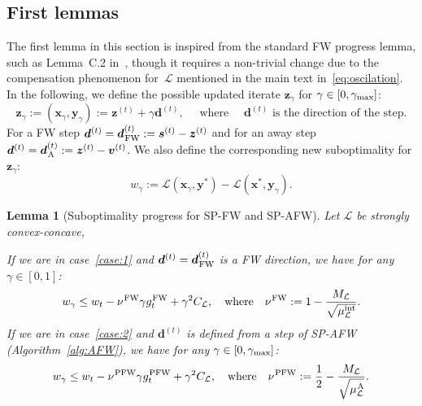 \documentclass[twoside]{article}
\renewcommand{\L}{\mathcal{L}}
\newcommand{\x}{\bm{x}}
\newcommand{\y}{\bm{y}}
\newcommand{\z}{\bm{z}}
\newcommand{\zt}{\bm{z}^{(t)}}
\newcommand{\st}{\bm{s}^{(t)}}
\newcommand{\vt}{\bm{v}^{(t)}}
\newcommand{\dt}{\bm{d}^{(t)}}
\newcommand{\wt}{w_t}
\newcommand{\gap}{g_{t}}
\newcommand{\CondNumb}{\nu}
\newtheorem{lemma}[definition]{Lemma}
\newcommand{\stepsize}{\gamma}
\newcommand{\stepmax}{\stepsize_{\textnormal{\scriptsize max}}} %
\newcommand{\FW}{{\hspace{0.05em}\textnormal{FW}}}
\newcommand{\PW}{{\hspace{0.05em}\textnormal{PFW}}}
\newcommand{\away}{{\hspace{0.05em}\textnormal{A}}}
\newcommand{\muIntL}{\mu^{\text{int}}_\L} %
\newcommand{\0}{\mathbf{0}} %
\begin{document}
\subsection{First lemmas}
  The first lemma in this section is inspired from the standard FW progress lemma, such as Lemma~C.2 in~\citep{lacoste2013block}, though it requires a non-trivial change due to the compensation phenomenon for~$\L$ mentioned in the main text in~\eqref{eq:oscilation}.
  In the following, we define the possible updated iterate $\z_\stepsize$ for $\stepsize \in [0, \stepmax]$:
  \begin{equation}
  \z_\gamma := (\x_\gamma, \y_\gamma):= \zt + \gamma \dt, \quad \text{ where } \quad \dt \text{ is the direction of the step.}
  \end{equation}
  For a FW step $\dt = \dt_{\FW}:= \st - \zt$ and for an away step $\dt = \dt_{\away} := \zt - \vt$. We also define the corresponding new suboptimality for $\z_\gamma$:
  \begin{equation}
    w_\gamma := \L(\x_\gamma, \y^*) - \L(\x^*,\y_\gamma).
  \end{equation}
  \begin{lemma}[Suboptimality progress for SP-FW and SP-AFW] \label{lemme:ineg}
  Let $\L$ be strongly convex-concave, 

    If we are in case~\eqref{case:1} and $\dt = \dt_{\FW}$ is a FW direction, we have for any $\stepsize \in [0,1]$:
      \begin{equation}  \label{eq:wInequalityCaseI}
      w_\gamma 
       \leq \wt  
      - \CondNumb^{\FW}\gamma \gap^{\FW}
      + \gamma^2 {C_\L},
      \quad \text{where} \quad 
      \CondNumb^{\FW} :=1- \frac{M_\L }{\sqrt{\muIntL}}.
      \end{equation}
    If we are in case~\eqref{case:2} and $\dt$ is defined from a step of SP-AFW (Algorithm~\ref{alg:AFW}), we have for any $\stepsize \in [0, \stepmax]$:
      \begin{equation} \label{eq:wInequalityCaseP} 
      w_\gamma 
       \leq \wt  
      - \CondNumb^{\PW} \gamma \gap^{\PW}
      + \gamma^2 {C_\L},
      \quad \text{where} \quad
      \CondNumb^{\PW} := \frac{1}{2}- \frac{M_\L }{\sqrt{\mu^{\away}_\L}}.
      \end{equation}
  \end{lemma}
\end{document}

